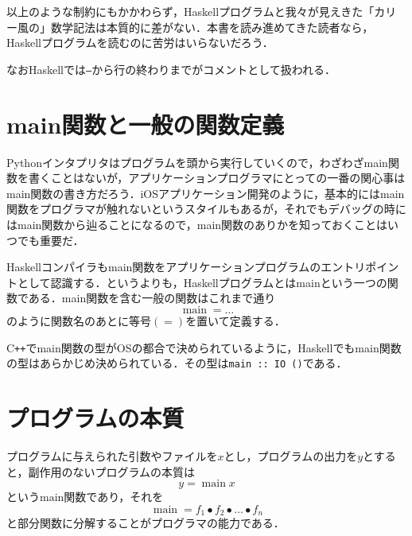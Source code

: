 \documentclass[a4paper]{jsbook}
\newcommand{\programminglanguage}[1]{\textsf{#1}}
\newcommand{\cxx}{\programminglanguage{C}\texttt{++}}
\newcommand{\haskell}{\programminglanguage{Haskell}}
\newcommand{\python}{\programminglanguage{Python}}
\newcommand{\code}[1]{\texttt{#1}}
\DeclareMathOperator{\mathMain}{main}
\newcommand{\mathCompose}{\mathbin{\bullet}}
\begin{document}
以上のような制約にもかかわらず，\haskell プログラムと我々が見えきた「カリー風の」数学記法は本質的に差がない．本書を読み進めてきた読者なら，\haskell プログラムを読むのに苦労はいらないだろう．

なお\haskell では\code{--}から行の終わりまでがコメントとして扱われる．

\section{main関数と一般の関数定義}

\python インタプリタはプログラムを頭から実行していくので，わざわざmain関数を書くことはないが，アプリケーションプログラマにとっての一番の関心事はmain関数の書き方だろう．iOSアプリケーション開発のように，基本的にはmain関数をプログラマが触れないというスタイルもあるが，それでもデバッグの時にはmain関数から辿ることになるので，main関数のありかを知っておくことはいつでも重要だ．

\haskell コンパイラもmain関数をアプリケーションプログラムのエントリポイントとして認識する．というよりも，\haskell プログラムとはmainという一つの関数である．main関数を含む一般の関数はこれまで通り
\begin{equation}
\mathMain=\dots
\end{equation}
のように関数名のあとに等号$(=)$を置いて定義する．

\cxx でmain関数の型がOSの都合で決められているように，\haskell でもmain関数の型はあらかじめ決められている．その型は\code{main :: IO ()}である．


\section{プログラムの本質}

プログラムに与えられた引数やファイルを$x$とし，プログラムの出力を$y$とすると，副作用のないプログラムの本質は
\begin{equation}
y=\mathMain x
\end{equation}
という$\text{main}$関数であり，それを
\begin{equation}
\mathMain=f_1\mathCompose f_2\mathCompose\dots\mathCompose f_n
\end{equation}
と部分関数に分解することがプログラマの能力である．
\end{document}
